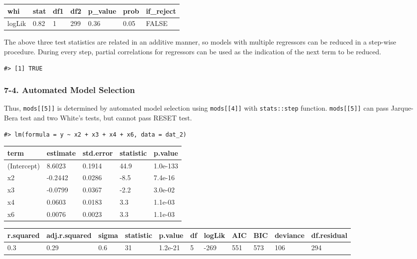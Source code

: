 \documentclass[main.tex]{subfiles}
\begin{document}
\begin{table}[H]
\centering
\begin{tabular}{lllllll}
\toprule
whi & stat & df1 & df2 & p\_value & prob & if\_reject\\
\midrule
logLik & 0.82 & 1 & 299 & 0.36 & 0.05 & FALSE\\
\bottomrule
\end{tabular}
\end{table}

The above three test statistics are related in an additive manner, so
models with multiple regressors can be reduced in a step-wise procedure.
During every step, partial correlations for regressors can be used as
the indication of the next term to be reduced.

\begin{verbatim}
#> [1] TRUE
\end{verbatim}

\hypertarget{automated-model-selection}{%
\subsubsection{7-4. Automated Model
Selection}\label{automated-model-selection}}

Thus, \texttt{mods{[}{[}5{]}{]}} is determined by automated model
selection using \texttt{mods{[}{[}4{]}{]}} with \texttt{stats::step}
function. \texttt{mods{[}{[}5{]}{]}} can pass Jarque-Bera test and two
White's tests, but cannot pass RESET test.

\begin{verbatim}
#> lm(formula = y ~ x2 + x3 + x4 + x6, data = dat_2)
\end{verbatim}

\begin{table}[H]
\centering
\begin{tabular}{lllll}
\toprule
term & estimate & std.error & statistic & p.value\\
\midrule
(Intercept) & 8.6023 & 0.1914 & 44.9 & 1.0e-133\\
x2 & -0.2442 & 0.0286 & -8.5 & 7.4e-16\\
x3 & -0.0799 & 0.0367 & -2.2 & 3.0e-02\\
x4 & 0.0603 & 0.0183 & 3.3 & 1.1e-03\\
x6 & 0.0076 & 0.0023 & 3.3 & 1.1e-03\\
\bottomrule
\end{tabular}
\end{table}

\begin{table}[H]
\centering
\begin{tabular}{lllllllllll}
\toprule
r.squared & adj.r.squared & sigma & statistic & p.value & df & logLik & AIC & BIC & deviance & df.residual\\
\midrule
0.3 & 0.29 & 0.6 & 31 & 1.2e-21 & 5 & -269 & 551 & 573 & 106 & 294\\
\bottomrule
\end{tabular}
\end{table}
\end{document}

